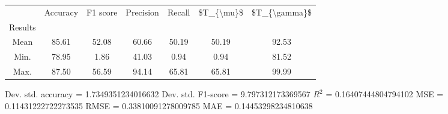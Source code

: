 \begin{tabular}{|c|c|c|c|c|c|c|}
\toprule
{} &  Accuracy &  F1 score &  Precision &  Recall &  \$T\_\{\textbackslash mu\}\$ &  \$T\_\{\textbackslash gamma\}\$ \\
Results &           &           &            &         &            &               \\
\hline
Mean    &     85.61 &     52.08 &      60.66 &   50.19 &      50.19 &         92.53 \\
Min.    &     78.95 &      1.86 &      41.03 &    0.94 &       0.94 &         81.52 \\
Max.    &     87.50 &     56.59 &      94.14 &   65.81 &      65.81 &         99.99 \\
\bottomrule
\end{tabular}

 Dev. std. accuracy = 1.7349351234016632
 Dev. std. F1-score = 9.797312173369567
 $R^2$ = 0.16407444804794102
 MSE = 0.11431222722273535
 RMSE = 0.33810091278009785
 MAE = 0.14453298234810638